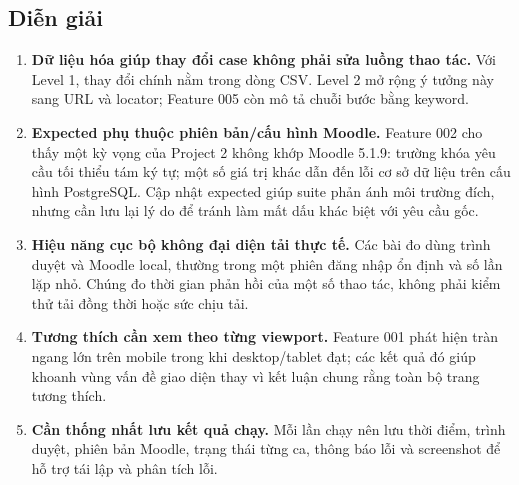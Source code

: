 \subsection{Diễn giải}
\begin{enumerate}
  \item \textbf{Dữ liệu hóa giúp thay đổi case không phải sửa luồng thao tác.} Với Level 1, thay đổi chính nằm trong dòng CSV. Level 2 mở rộng ý tưởng này sang URL và locator; Feature 005 còn mô tả chuỗi bước bằng keyword.
  \item \textbf{Expected phụ thuộc phiên bản/cấu hình Moodle.} Feature 002 cho thấy một kỳ vọng của Project 2 không khớp Moodle 5.1.9: trường khóa yêu cầu tối thiểu tám ký tự; một số giá trị khác dẫn đến lỗi cơ sở dữ liệu trên cấu hình PostgreSQL. Cập nhật expected giúp suite phản ánh môi trường đích, nhưng cần lưu lại lý do để tránh làm mất dấu khác biệt với yêu cầu gốc.
  \item \textbf{Hiệu năng cục bộ không đại diện tải thực tế.} Các bài đo dùng trình duyệt và Moodle local, thường trong một phiên đăng nhập ổn định và số lần lặp nhỏ. Chúng đo thời gian phản hồi của một số thao tác, không phải kiểm thử tải đồng thời hoặc sức chịu tải.
  \item \textbf{Tương thích cần xem theo từng viewport.} Feature 001 phát hiện tràn ngang lớn trên mobile trong khi desktop/tablet đạt; các kết quả đó giúp khoanh vùng vấn đề giao diện thay vì kết luận chung rằng toàn bộ trang tương thích.
  \item \textbf{Cần thống nhất lưu kết quả chạy.} Mỗi lần chạy nên lưu thời điểm, trình duyệt, phiên bản Moodle, trạng thái từng ca, thông báo lỗi và screenshot để hỗ trợ tái lập và phân tích lỗi.
\end{enumerate}
